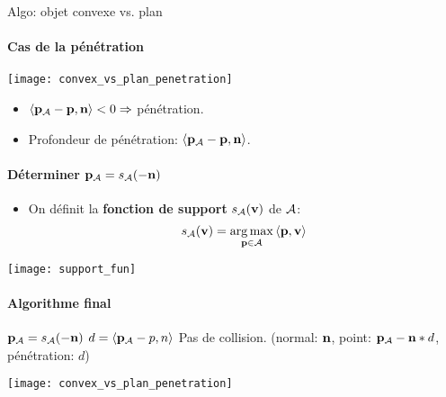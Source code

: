 \begin{frame}[fragile]{Algo: objet convexe vs. plan}
{\begin{overlayarea}{10cm}{10cm}
{       }
        {
            \framesubtitle{Cas de la pénétration}
           \begin{center}
               \texttt{[image: convex\_vs\_plan\_penetration]}
           \end{center}
           \begin{itemize}
               \item $\left< {\bf p_\mathcal{A}} - \textbf{p}, {\bf n} \right> < 0 \Rightarrow$ pénétration.
               \item Profondeur de pénétration: $\left< {\bf p_\mathcal{A}} - \textbf{p}, {\bf n}\right>$.
           \end{itemize}
       }
         {
            \framesubtitle{Déterminer ${\bf p_\mathcal{A}} = s_{\mathcal{A}}(-{\bf n})$}
                \begin{itemize}
                    \item On définit la \textbf{fonction de support} $s_{\mathcal{A}}(\textbf{v})$
                        de $\mathcal{A}$:
                        \[
                            s_{\mathcal{A}}(\textbf{v}) = \operatorname*{arg\,max}\limits_{\textbf{p} \in \mathcal{A}} \left< \textbf{p}, \textbf{v} \right>
                        \]
                \end{itemize}
                \begin{center}
                    \texttt{[image: support\_fun]}
                \end{center}
        }
         {
            \framesubtitle{Algorithme final}
            \begin{algorithm}[H]
            \begin{algorithmic}[1]
                \STATE ${\bf p_\mathcal{A}}  = s_{\mathcal{A}}(-{\bf n})$
                \STATE $d = \left< {\bf p_\mathcal{A}} - p, n \right>$
                    \RETURN Pas de collision.
                \ENDIF
                \RETURN (normal: ${\bf n}$, point: ${\bf p_\mathcal{A}} - {\bf n} * d$, pénétration: $d$)
            \end{algorithmic}
            \end{algorithm}
                \begin{center}
                    \texttt{[image: convex\_vs\_plan\_penetration]}
                \end{center}
        }
    \end{overlayarea}
    }
\end{frame}

